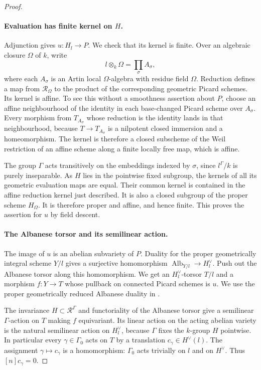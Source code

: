 \begin{proof}
\paragraph{Evaluation has finite kernel on $H$.}
Adjunction gives $u:H_l\to P$.  We check that its kernel is
finite.  Over an algebraic closure $\Omega$ of $k$, write
\[
 l\otimes_k\Omega=\prod_{\sigma}A_\sigma,
\]
where each $A_\sigma$ is an Artin local $\Omega$-algebra with
residue field $\Omega$.  Reduction defines a map from
$\mathcal R_\Omega$ to the product of the corresponding
geometric Picard schemes.  Its kernel is affine.  To see this
without a smoothness assertion about $P$, choose an affine
neighbourhood of the identity in each base-changed Picard
scheme over $A_\sigma$.  Every morphism from $T_{A_\sigma}$
whose reduction is the identity lands in that neighbourhood,
because $T\to T_{A_\sigma}$ is a nilpotent closed immersion
and a homeomorphism.  The kernel is therefore a closed
subscheme of the Weil restriction of an affine scheme along
a finite locally free map, which is affine.

The group $\Gamma$ acts transitively on the embeddings indexed
by $\sigma$, since $l^\Gamma/k$ is purely inseparable.
As $H$ lies in the pointwise fixed subgroup, the kernels of all
its geometric evaluation maps are equal.  Their common kernel
is contained in the affine reduction kernel just described.
It is also a closed subgroup of the proper scheme $H_\Omega$.
It is therefore proper and affine, and hence finite.
This proves the assertion for $u$ by field descent.

\paragraph{The Albanese torsor and its semilinear action.}
The image of $u$ is an abelian subvariety of $P$.
Duality for the proper geometrically integral scheme $Y/l$
gives a surjective homomorphism
$\operatorname{Alb}_{Y/l}\to H_l^\vee$.
Push out the Albanese torsor along this homomorphism.  We get
an $H_l^\vee$-torsor $T/l$ and a morphism $f:Y\to T$ whose
pullback on connected Picard schemes is $u$.
We use the proper geometrically reduced Albanese duality in
\cite[Theorem~3.2 and Remark~3.3, author pp.~12--13]{C_ACMV2026}.

The invariance $H\subset\mathcal R^\Gamma$ and functoriality
of the Albanese torsor give a semilinear $\Gamma$-action on
$T$ making $f$ equivariant.  Its linear action on the acting
abelian variety is the natural semilinear action on
$H^\vee_l$, because $\Gamma$ fixes the $k$-group $H$ pointwise.
In particular every $\gamma\in\Gamma_0$ acts on $T$ by a
translation $c_\gamma\in H^\vee(l)$.  The assignment
$\gamma\mapsto c_\gamma$ is a homomorphism: $\Gamma_0$ acts
trivially on $l$ and on $H^\vee$.  Thus $[n]c_\gamma=0$.


\end{proof}
